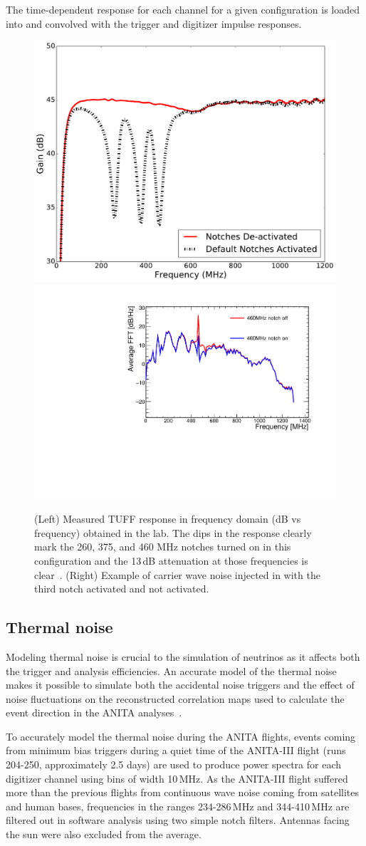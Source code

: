 The time-dependent response for each channel for a given configuration is loaded into \icemc and convolved with the trigger and digitizer impulse responses. 

\begin{figure}
  \centering
 \includegraphics[width=0.4\linewidth] {./Figs/measured_gain_freq_on_off.pdf} 
 \includegraphics[width=0.45\linewidth] {./Figs/Icemc_tuffs.pdf} 
  \caption{(Left) Measured TUFF response in frequency domain (dB vs frequency) obtained in the lab. The dips in the response clearly mark the 260, 375, and 460 MHz notches turned on in this configuration and the 13\,dB attenuation at those frequencies is clear~\cite{Allison:2017vtk}.
  (Right) Example of carrier wave noise injected in \icemc with the third notch activated and not activated.}
\label{fig:TUFFs}
\end{figure}



\subsection{Thermal noise}
\label{subsec:ANITA_thermalNoise}
Modeling thermal noise is crucial to the simulation of
neutrinos as it affects both the trigger and analysis efficiencies.
An accurate model of the thermal noise makes it possible to simulate both the
accidental noise triggers and the effect of noise fluctuations on the
reconstructed correlation maps used to calculate the event direction in the ANITA analyses~\cite{romero2015interferometric}.

To accurately model the thermal noise during the ANITA flights, events coming from minimum bias triggers during
a quiet time of the ANITA-III flight (runs 204-250, approximately 2.5
days) are used to produce power spectra for each digitizer channel
using bins of width 10\,MHz.
As the ANITA-III flight suffered more than the previous flights 
from continuous wave noise coming
from satellites and human bases, frequencies in the ranges
234-286\,MHz and 344-410\,MHz are filtered out in software analysis
using two simple notch filters. 
Antennas facing the sun were also excluded from the average.

